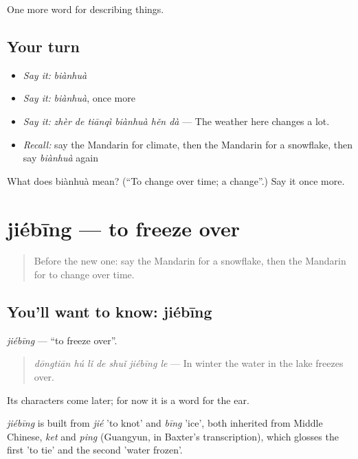\begin{grammarlens}[title={What you've built}]
One more word for describing things.
\end{grammarlens}

\subsection*{Your turn}
\begin{itemize}
\raggedright
  \item \emph{Say it:} \emph{biànhuà}
  \item \emph{Say it:} \emph{biànhuà}, once more
  \item \emph{Say it:} \emph{zhèr de tiānqì biànhuà hěn dà} — The weather here changes a lot.
  \item \emph{Recall:} say the Mandarin for climate, then the Mandarin for a snowflake, then say \emph{biànhuà} again
\end{itemize}

\begin{tcolorbox}[breakable,colback=teal!4,colframe=teal!35!black,title={Before you move on}]
What does biànhuà mean? (\textquotedblleft{}To change over time; a change\textquotedblright{}.) Say it once more.
\end{tcolorbox}
\section[jiébīng]{jiébīng — to freeze over}

\label{lesson:ZH-C243-jiebing}



\begin{quote}
Before the new one: say the Mandarin for a snowflake, then the Mandarin for to change over time.
\end{quote}

\subsection*{You'll want to know: jiébīng}
\emph{jiébīng} — \textquotedblleft{}to freeze over\textquotedblright{}.

\begin{quote}
\emph{dōngtiān hú lǐ de shuǐ jiébīng le} — In winter the water in the lake freezes over.
\end{quote}

Its characters come later; for now it is a word for the ear.

\begin{cousinweb}
\emph{jiébīng} is built from \emph{jié} 'to knot' and \emph{bīng} 'ice', both inherited from Middle Chinese, \emph{ket} and \emph{ping} (Guangyun, in Baxter's transcription), which glosses the first 'to tie' and the second 'water frozen'.
\end{cousinweb}

